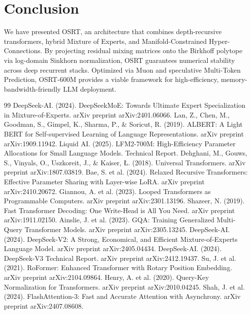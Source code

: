 \documentclass[11pt,twocolumn]{article}
\begin{document}
\section{Conclusion}
We have presented OSRT, an architecture that combines depth-recursive transformers, hybrid Mixture of Experts, and Manifold-Constrained Hyper-Connections. By projecting residual mixing matrices onto the Birkhoff polytope via log-domain Sinkhorn normalization, OSRT guarantees numerical stability across deep recurrent stacks. Optimized via Muon and speculative Multi-Token Prediction, OSRT-600M provides a viable framework for high-efficiency, memory-bandwidth-friendly LLM deployment.

\begin{thebibliography}{99}
 DeepSeek-AI. (2024). DeepSeekMoE: Towards Ultimate Expert Specialization in Mixture-of-Experts. arXiv preprint arXiv:2401.06066.
 Lan, Z., Chen, M., Goodman, S., Gimpel, K., Sharma, P., \& Soricut, R. (2019). ALBERT: A Light BERT for Self-supervised Learning of Language Representations. arXiv preprint arXiv:1909.11942.
 Liquid AI. (2025). LFM2-700M: High-Efficiency Parameter Allocations for Small Language Models. Technical Report.
 Dehghani, M., Gouws, S., Vinyals, O., Uszkoreit, J., \& Kaiser, Ł. (2018). Universal Transformers. arXiv preprint arXiv:1807.03819.
 Bae, S. et al. (2024). Relaxed Recursive Transformers: Effective Parameter Sharing with Layer-wise LoRA. arXiv preprint arXiv:2410.20672.
 Giannou, A. et al. (2023). Looped Transformers as Programmable Computers. arXiv preprint arXiv:2301.13196.
 Shazeer, N. (2019). Fast Transformer Decoding: One Write-Head is All You Need. arXiv preprint arXiv:1911.02150.
 Ainslie, J. et al. (2023). GQA: Training Generalized Multi-Query Transformer Models. arXiv preprint arXiv:2305.13245.
 DeepSeek-AI. (2024). DeepSeek-V2: A Strong, Economical, and Efficient Mixture-of-Experts Language Model. arXiv preprint arXiv:2405.04434.
 DeepSeek-AI. (2024). DeepSeek-V3 Technical Report. arXiv preprint arXiv:2412.19437.
 Su, J. et al. (2021). RoFormer: Enhanced Transformer with Rotary Position Embedding. arXiv preprint arXiv:2104.09864.
 Henry, A. et al. (2020). Query-Key Normalization for Transformers. arXiv preprint arXiv:2010.04245.
 Shah, J. et al. (2024). FlashAttention-3: Fast and Accurate Attention with Asynchrony. arXiv preprint arXiv:2407.08608.

\end{thebibliography}
\end{document}

